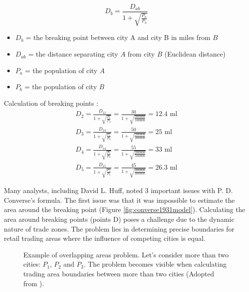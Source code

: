 \begin{equation}
D_b=\frac{ D_{ab} }{ 1+\sqrt{\frac{P_a}{P_b}} }
\label{ConverseEquation}
\end{equation}

\begin{itemize}
    \item{$D_b$ = the breaking point between city A and city B in miles from $B$}
    \item{$D_{ab}$ = the distance separating city $A$ from city $B$ (Euclidean distance)}
    \item{$P_a$ = the population of city $A$}
    \item{$P_b$ = the population of city $B$}
\end{itemize}

Calculation of breaking points \cite{huff1964defining}:
\begin{equation}
\begin{split}
D_2 = \frac{D_{12}}{1 + \sqrt{\frac{P_1}{P_2}}} = \frac{30}{1 + \sqrt{\frac{200000}{100000}}} = 12.4 \text{ ml}
\\
D_3 = \frac{D_{13}}{1 + \sqrt{\frac{P_1}{P_3}}} = \frac{50}{1 + \sqrt{\frac{200000}{200000}}} = 25 \text{ ml}
\\
D_4 = \frac{D_{14}}{1 + \sqrt{\frac{P_1}{P_4}}} = \frac{55}{1 + \sqrt{\frac{200000}{500000}}} = 33 \text{ ml}
\\
D_5 = \frac{D_{15}}{1 + \sqrt{\frac{P_1}{P_5}}} = \frac{45}{1 + \sqrt{\frac{200000}{400000}}} = 26.3 \text{ ml}
\end{split}
\label{eq:huff1964converse}
\end{equation}

Many analysts, including David L. Huff, noted 3 important issues with P. D. Converse's formula. The first issue was that it was impossible to estimate the area around the breaking point (Figure \ref{fig:converse1931model}). Calculating the area around breaking points (points D) poses a challenge due to the dynamic nature of trade zones. The problem lies in determining precise boundaries for retail trading areas where the influence of competing cities is equal.

\begin{figure}[ht]
	\centering
	
	\caption{Example of overlapping areas problem. Let's consider more than two cities: $P_1$, $P_2$ and $P_3$. The problem becomes visible when calculating trading area boundaries between more than two cities \cite{huff1964defining} (Adopted from \cite{huff1964defining}).}
	\label{OverlappingAreas}
\end{figure}


